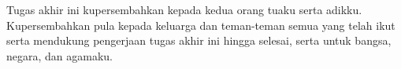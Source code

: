 \vspace{7cm}

\begin{center}
	Tugas akhir ini kupersembahkan kepada kedua orang tuaku serta adikku. Kupersembahkan pula kepada keluarga dan teman-teman semua yang telah ikut serta mendukung pengerjaan tugas akhir ini hingga selesai, serta untuk bangsa, negara, dan agamaku.
\end{center}
